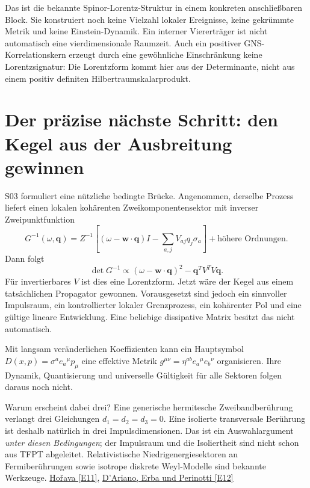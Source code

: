 Das ist die bekannte Spinor-Lorentz-Struktur in einem konkreten anschließbaren Block. Sie konstruiert noch keine Vielzahl lokaler Ereignisse, keine gekrümmte Metrik und keine Einstein-Dynamik. Ein interner Viererträger ist nicht automatisch eine vierdimensionale Raumzeit. Auch ein positiver GNS-Korrelationskern erzeugt durch eine gewöhnliche Einschränkung keine Lorentzsignatur: Die Lorentzform kommt hier aus der Determinante, nicht aus einem positiv definiten Hilbertraumskalarprodukt. 

\section{Der präzise nächste Schritt: den Kegel aus der Ausbreitung gewinnen}
S03 formuliert eine nützliche bedingte Brücke. Angenommen, derselbe Prozess liefert einen lokalen kohärenten Zweikomponentensektor mit inverser Zweipunktfunktion
\begin{equation}
G^{-1}(\omega,\mathbf q)=Z^{-1}
\left[(\omega-\mathbf w\cdot\mathbf q)I-\sum_{a,j}V_{aj}q_j\sigma_a\right]
+\text{höhere Ordnungen}.
\end{equation}
Dann folgt
\begin{equation}
\det G^{-1}\propto(\omega-\mathbf w\cdot\mathbf q)^2-\mathbf q^TV^TV\mathbf q.
\end{equation}
Für invertierbares $V$ ist dies eine Lorentzform. Jetzt wäre der Kegel aus einem tatsächlichen Propagator gewonnen. Vorausgesetzt sind jedoch ein sinnvoller Impulsraum, ein kontrollierter lokaler Grenzprozess, ein kohärenter Pol und eine gültige lineare Entwicklung. Eine beliebige dissipative Matrix besitzt das nicht automatisch.

Mit langsam veränderlichen Koeffizienten kann ein Hauptsymbol $D(x,p)=\sigma^ae_a{}^\mu p_\mu$ eine effektive Metrik $g^{\mu\nu}=\eta^{ab}e_a{}^\mu e_b{}^\nu$ organisieren. Ihre Dynamik, Quantisierung und universelle Gültigkeit für alle Sektoren folgen daraus noch nicht.

Warum erscheint dabei drei? Eine generische hermitesche Zweibandberührung verlangt drei Gleichungen $d_1=d_2=d_3=0$. Eine isolierte transversale Berührung ist deshalb natürlich in drei Impulsdimensionen. Das ist ein Auswahlargument \emph{unter diesen Bedingungen}; der Impulsraum und die Isoliertheit sind nicht schon aus TFPT abgeleitet. Relativistische Niedrigenergiesektoren an Fermiberührungen sowie isotrope diskrete Weyl-Modelle sind bekannte Werkzeuge. \href{https://arxiv.org/abs/hep-th/0503006}{Hořava [E11]}, \href{https://arxiv.org/abs/1708.00826}{D'Ariano, Erba und Perinotti [E12]}

